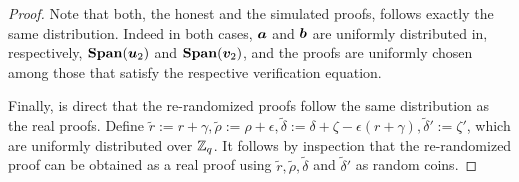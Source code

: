 \begin{proof}
Note that both, the honest and the simulated proofs, follows exactly the same distribution. Indeed in both cases, ${\boldsymbol{a}}$ and ${\boldsymbol{b}}$ are uniformly distributed in, respectively, $\mathbf{Span}({\boldsymbol{u}}_2)$ and $\mathbf{Span}({\boldsymbol{v}}_2)$, and the proofs are uniformly chosen among those that satisfy the respective verification equation.

Finally, is direct that the re-randomized proofs follow the same distribution as the real proofs.
Define $\tilde{r} := r + \gamma,\tilde{\rho} := \rho+\epsilon,\tilde{\delta} := \delta+\zeta-\epsilon(r+\gamma), \tilde{\delta}' := \zeta'$, which are uniformly distributed over $\mathbb{Z}_q$.
It follows by inspection that the re-randomized proof can be obtained as a real proof using $\tilde{r},\tilde{\rho},\tilde{\delta}$ and $\tilde{\delta}'$ as random coins.
\end{proof} 